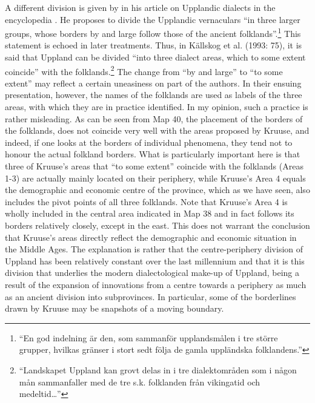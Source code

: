 A different division is given by \citet[1194]{Hesselman1920} in his article on Upplandic dialects in the encyclopedia . He proposes to divide the Upplandic vernaculars “in three larger groups, whose borders by and large follow those of the ancient folklands”.\footnote{ “En god indelning är den, som sammanför upplandsmålen i tre större grupper, hvilkas gränser i stort sedt följa de gamla uppländska folklandens.” } This statement is echoed in later treatments. Thus, in Källskog et al. (1993: 75), it is said that Uppland can be divided “into three dialect areas, which to some extent coincide” with the folklands.\footnote{ “Landskapet Uppland kan grovt delas in i tre dialektområden som i någon mån sammanfaller med de tre s.k. folklanden från vikingatid och medeltid…” } The change from “by and large” to “to some extent” may reflect a certain uneasiness on part of the authors. In their ensuing presentation, however, the names of the folklands are used as labels of the three areas, with which they are in practice identified. In my opinion, such a practice is rather misleading. As can be seen from Map 40, the placement of the borders of the folklands, does not coincide very well with the areas proposed by Kruuse, and indeed, if one looks at the borders of individual phenomena, they tend not to honour the actual folkland borders. What is particularly important here is that three of Kruuse’s areas that “to some extent” coincide with the folklands (Areas 1-3) are actually mainly located on their periphery, while Kruuse’s Area 4 equals the demographic and economic centre of the province, which as we have seen, also includes the pivot points of all three folklands. Note that Kruuse’s Area 4 is wholly included in the central area indicated in Map 38 and in fact follows its borders relatively closely, except in the east. This does not warrant the conclusion that Kruuse’s areas directly reflect the demographic and economic situation in the Middle Ages. The explanation is rather that the centre-periphery division of Uppland has been relatively constant over the last millennium and that it is this division that underlies the modern dialectological make-up of Uppland, being a result of the expansion of innovations from a centre towards a periphery as much as an ancient division into subprovinces. In particular, some of the borderlines drawn by Kruuse may be snapshots of a moving boundary.


